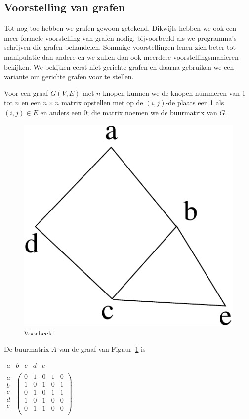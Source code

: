 \subsection{Voorstelling van grafen \label{voorstelgraaf}}

Tot nog toe hebben we grafen gewoon getekend. Dikwijls hebben we ook
een meer formele voorstelling van grafen nodig, bijvoorbeeld als we
programma's schrijven die grafen behandelen. Sommige voorstellingen
lenen zich beter tot manipulatie dan andere en we zullen dan ook
meerdere voorstellingsmanieren bekijken. We bekijken eerst
niet-gerichte grafen en daarna gebruiken we een variante om gerichte
grafen voor te stellen.

Voor een graaf $G(V,E)$ met $n$ knopen kunnen we de knopen nummeren van 1
tot $n$ en een $n\times n$ matrix opstellen met op de $(i,j)$-de plaats 
een 1 als
$(i,j) \in E$ en anders een 0; die matrix noemen we de
buurmatrix van $G$.

\begin{figure}[ht]
\begin{center}
\includegraphics[width=0.2\linewidth,keepaspectratio]{adjacency1}
\end{center}
\caption{ Voorbeeld \label{adjacency1}}
\end{figure}

De buurmatrix $A$ van de graaf van Figuur~\ref{adjacency1} is

\begin{center}
\mbox{\space \space \space}
$\begin{array}{ccccc}
a & b & c & d & e\\
\end{array}
$\\
$
\begin{array}{c}
a\\
b\\
c\\
d\\
e\\
\end{array}
$
$
\left(
\begin{array}{ccccc}
0 & 1 & 0 & 1 & 0\\
1 & 0 & 1 & 0 & 1\\
0 & 1 & 0 & 1 & 1\\
1 & 0 & 1 & 0 & 0\\
0 & 1 & 1 & 0 & 0\\
\end{array}
\right)
$
\end{center}

